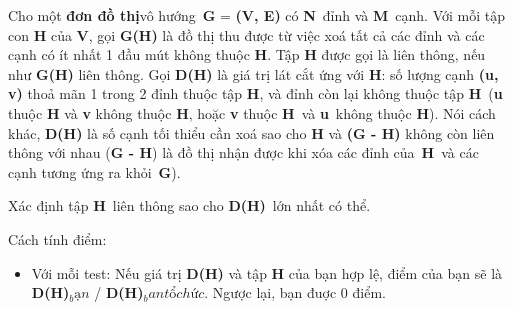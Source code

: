 Cho một \textbf{đơn đồ thị}vô hướng \textbf{G} = \textbf{(V, E)} có \textbf{N} đỉnh và \textbf{M} cạnh. Với mỗi tập con \textbf{H} của \textbf{V}, gọi \textbf{G(H)} là đồ thị thu được từ việc xoá tất cả các đỉnh và các cạnh có ít nhất 1 đầu mút không thuộc \textbf{H}. Tập \textbf{H} được gọi là liên thông, nếu như \textbf{G(H)} liên thông. Gọi \textbf{D(H)} là giá trị lát cắt ứng với \textbf{H}: số lượng cạnh \textbf{(u, v)} thoả mãn 1 trong 2 đỉnh thuộc tập \textbf{H}, và đỉnh còn lại không thuộc tập \textbf{H} (\textbf{u} thuộc \textbf{H} và \textbf{v} không thuộc \textbf{H}, hoặc \textbf{v} thuộc \textbf{H} và \textbf{u} không thuộc \textbf{H}). Nói cách khác, \textbf{D(H)} là số cạnh tối thiểu cần xoá sao cho \textbf{H} và \textbf{(G - H) }không còn liên thông với nhau (\textbf{G - H}) là đồ thị nhận được khi xóa các đỉnh của \textbf{H} và các cạnh tương ứng ra khỏi \textbf{G}).

Xác định tập \textbf{H} liên thông sao cho \textbf{D(H)} lớn nhất có thể.

Cách tính điểm:
\begin{itemize}
	\item Với mỗi test: Nếu giá trị \textbf{D(H)} và tập \textbf{H} của bạn hợp lệ, điểm của bạn sẽ là \textbf{D(H)}$_bạn$ / \textbf{D(H)}$_ban tổ chức$. Ngược lại, bạn đuợc 0 điểm.
\end{itemize}